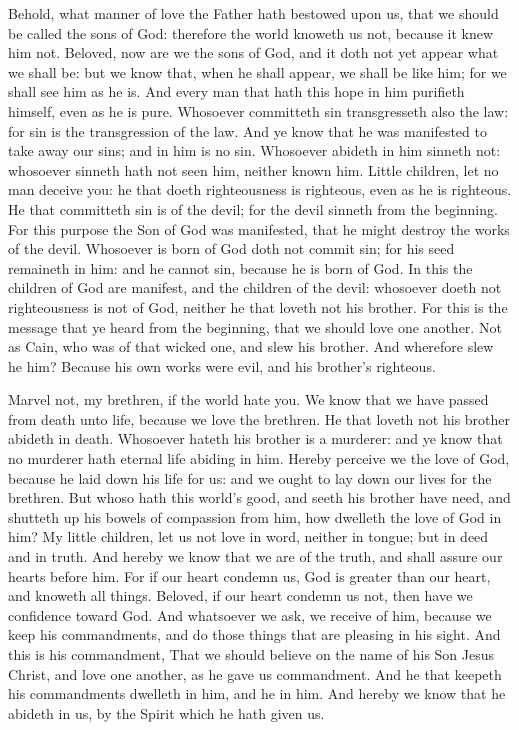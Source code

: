  Behold, what manner of love the Father hath bestowed upon
us, that we should be called the sons of God: therefore the world
knoweth us not, because it knew him not.  Beloved, now are
we the sons of God, and it doth not yet appear what we shall be: but we
know that, when he shall appear, we shall be like him; for we shall see
him as he is.  And every man that hath this hope in him
purifieth himself, even as he is pure.  Whosoever
committeth sin transgresseth also the law: for sin is the transgression
of the law.  And ye know that he was manifested to take
away our sins; and in him is no sin.  Whosoever abideth in
him sinneth not: whosoever sinneth hath not seen him, neither known him.
 Little children, let no man deceive you: he that doeth
righteousness is righteous, even as he is righteous.  He
that committeth sin is of the devil; for the devil sinneth from the
beginning. For this purpose the Son of God was manifested, that he might
destroy the works of the devil.  Whosoever is born of God
doth not commit sin; for his seed remaineth in him: and he cannot sin,
because he is born of God.  In this the children of God
are manifest, and the children of the devil: whosoever doeth not
righteousness is not of God, neither he that loveth not his brother.
 For this is the message that ye heard from the
beginning, that we should love one another.  Not as Cain,
who was of that wicked one, and slew his brother. And wherefore slew he
him? Because his own works were evil, and his brother's righteous.

 Marvel not, my brethren, if the world hate you.
 We know that we have passed from death unto life,
because we love the brethren. He that loveth not his brother abideth in
death.  Whosoever hateth his brother is a murderer: and
ye know that no murderer hath eternal life abiding in him.
 Hereby perceive we the love of God, because he laid down
his life for us: and we ought to lay down our lives for the brethren.
 But whoso hath this world's good, and seeth his brother
have need, and shutteth up his bowels of compassion from him, how
dwelleth the love of God in him?  My little children, let
us not love in word, neither in tongue; but in deed and in truth.
 And hereby we know that we are of the truth, and shall
assure our hearts before him.  For if our heart condemn
us, God is greater than our heart, and knoweth all things.
 Beloved, if our heart condemn us not, then have we
confidence toward God.  And whatsoever we ask, we receive
of him, because we keep his commandments, and do those things that are
pleasing in his sight.  And this is his commandment, That
we should believe on the name of his Son Jesus Christ, and love one
another, as he gave us commandment.  And he that keepeth
his commandments dwelleth in him, and he in him. And hereby we know that
he abideth in us, by the Spirit which he hath given us.

